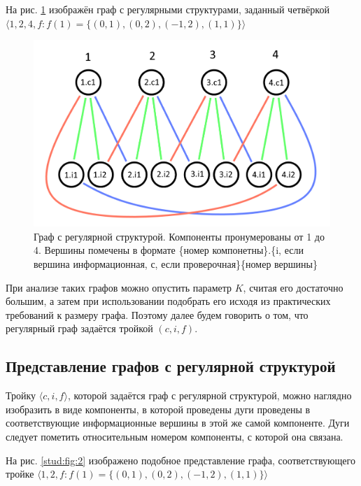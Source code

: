 \documentclass[14pt]{mmcs_article}
\begin{document}
На рис. \ref{stud:fig:1} изображён граф с регулярными структурами, заданный четвёркой $\langle 1, 2, 4, f: f(1) = \{ (0, 1), (0, 2), (-1, 2), (1, 1) \} \rangle$

\begin{figure}[H]
  \centering
  \includegraphics[scale=0.4]{Fig_1.png}
  \caption{ Граф с регулярной структурой. Компоненты пронумерованы от 1 до 4. Вершины помечены в формате \{номер компонетны\}.\{i, если вершина информационная, с, если проверочная\}\{номер вершины\} }\label{stud:fig:1}
\end{figure}

При анализе таких графов можно опустить параметр $K$, считая его достаточно большим, а затем при использовании подобрать его исходя из практических требований к размеру графа. Поэтому далее будем говорить о том, что регулярный граф задаётся тройкой $(c, i, f)$.

\subsection{Представление графов с регулярной структурой}

Тройку $\langle c, i, f \rangle$, которой задаётся граф с регулярной структурой, можно наглядно изобразить в виде компоненты, в которой проведены дуги проведены в соответствующие информационные вершины в этой же самой компоненте. Дуги следует пометить относительным номером компоненты, с которой она связана.

На рис. \ref{stud:fig:2} изображено подобное представление графа, соответствующего тройке $\langle 1, 2, f: f(1) = \{ (0, 1), (0, 2), (-1, 2), (1, 1) \} \rangle$
\end{document}
